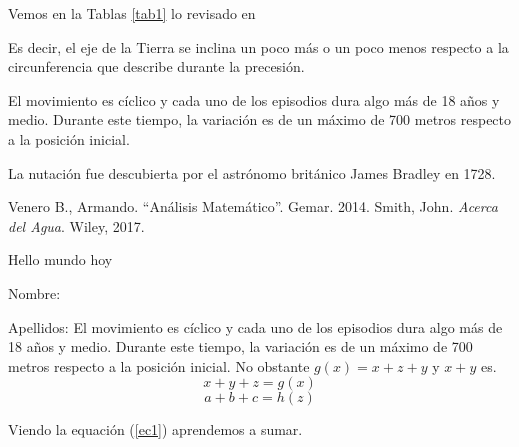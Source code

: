 \documentclass[12pt,a4paper]{article}
\begin{document}
Vemos en la Tablas \ref{tab1} lo revisado en \cite[cap.7]{smi17}


\setlength{\fboxrule}{0.4pt}
\setlength{\fboxsep}{3pt}

\begin{minipage}{3cm}
		Es decir, el eje de la Tierra se inclina un poco más o un poco menos respecto a la circunferencia que describe 
	durante la precesión.
	
	El movimiento es cíclico y cada uno de los episodios dura algo más de 18 años y medio. Durante este tiempo, 
	la variación es de un máximo de 700 metros respecto a la posición inicial.
	
	La nutación fue descubierta por el astrónomo británico James Bradley en 1728.
\end{minipage}

\begin{thebibliography}{99}
	 Venero B., Armando. 	``Análisis Matemático''. Gemar. 2014.
	 Smith, John. \emph{Acerca del Agua}. Wiley, 2017.
\end{thebibliography}

\newpage 
Hello
\vfill mundo \hfill hoy

Nombre:\hrulefill 

Apellidos: \dotfill
\clearpage
	El movimiento es cíclico y cada uno de los episodios dura algo más de 18 años y medio. Durante este tiempo, 
la variación es de un máximo de 700 metros respecto a la posición inicial. No obstante $g(x)=x+z+y$ y $x+y$ es.
$$
x+y+z = g(x)
$$
\begin{equation}\label{ec1}
a+b+c=h(z)
\end{equation}

Viendo la equación (\ref{ec1}) aprendemos a sumar.
\end{document}
